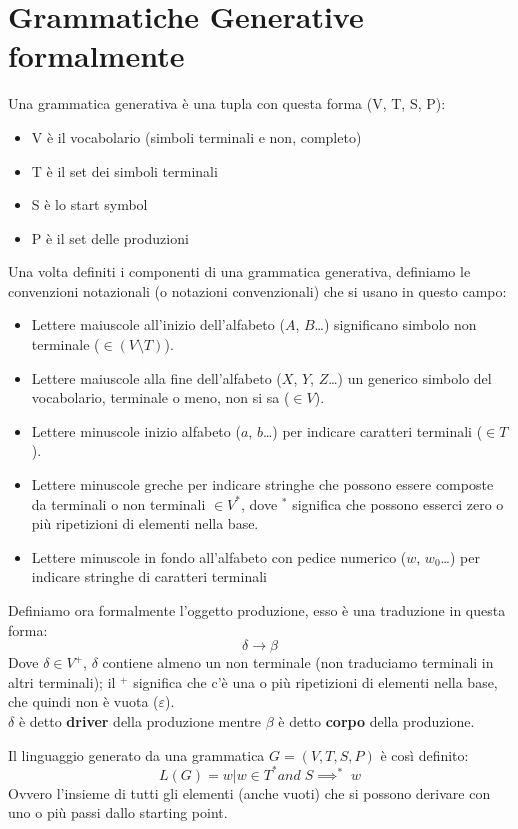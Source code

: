 \documentclass[class=book, crop=false, oneside]{standalone}
\begin{document}
\section{Grammatiche Generative formalmente}
Una grammatica generativa è una tupla con questa forma (V, T, S, P):
\begin{itemize}
    \item V è il vocabolario (simboli terminali e non, completo)
    \item T è il set dei simboli terminali
    \item S è lo start symbol
    \item P è il set delle produzioni
\end{itemize}
Una volta definiti i componenti di una grammatica generativa, definiamo le convenzioni notazionali (o notazioni convenzionali) che si usano in questo campo:
\begin{itemize}
    \item Lettere maiuscole all’inizio dell’alfabeto ($A$, $B$…) significano simbolo non terminale ($\in (V \setminus T)$).
    \item Lettere maiuscole alla fine dell’alfabeto ($X$, $Y$, $Z$…) un generico simbolo del vocabolario, terminale o meno, non si sa ($\in V$).
    \item Lettere minuscole inizio alfabeto ($a$, $b$…) per indicare caratteri terminali ($\in T$).
    \item Lettere minuscole greche per indicare stringhe che possono essere composte da terminali o non terminali $\in V^*$, dove $^*$ significa che possono esserci zero o più ripetizioni di elementi nella base.
    \item Lettere minuscole in fondo all’alfabeto con pedice numerico ($w$, $w_0$…) per indicare stringhe di caratteri terminali
\end{itemize}
Definiamo ora formalmente l'oggetto produzione, esso è una traduzione in questa forma:
\begin{equation}
    \delta \to \beta
\end{equation}
Dove $\delta \in V^+$, $\delta$ contiene almeno un non terminale (non traduciamo terminali in altri terminali); il $^+$ significa che c’è una o più ripetizioni di elementi nella base, che quindi non è vuota ($\varepsilon$).\\
$\delta$ è detto \textbf{driver} della produzione mentre $\beta$ è detto \textbf{corpo} della produzione.

Il linguaggio generato da una grammatica $G = (V,T,S,P)$ è così definito:
\begin{equation}
    L(G) = {w | w \in T^* and \; S \implies^* \; w }
\end{equation}
Ovvero l'insieme di tutti gli elementi (anche vuoti) che si possono derivare con uno o più passi dallo starting point.
\end{document}
